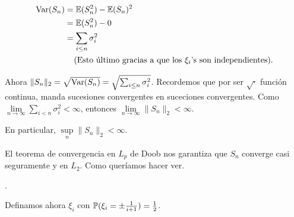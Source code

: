 \begin{align}
        \text{Var}\! \left( S_n \right)       &=  \mathbb{E}(S_n^2) - \mathbb{E}(S_n)^2                                               \\
                        &=  \mathbb{E}(S_n^2) - 0                                                       \\
                        &=  \sum_{i \leq n} \sigma_i^2                                          \\
                        &\;\;\;\;\mbox{(Esto último gracias a que los $\xi_i$'s son independientes)}.
\end{align}

Ahora $\| S_n \|_2 = \sqrt{\text{Var}\! \left( S_n \right)} = \sqrt{\sum_{i \leq n} \sigma_i^2}$. Recordemos que por ser  $\sqrt{\cdot}$
función continua, manda sucesiones convergentes en suceciones convergentes. Como 
$\lim\limits_{n \rightarrow \infty} \sum\limits_{i < n} \sigma_i^2 < \infty$, 
entonces $\lim\limits_{n \rightarrow \infty}\| S_n \|_2 < \infty$.\par\null

En particular, $\sup\limits_n \| S_n \|_2 < \infty$.\par\null

El teorema de convergencia en $L_p$ de Doob nos garantiza que $S_n$ converge casi seguramente y en $L_2$. Como queríamos
hacer ver.\par\null.

Definamos ahora $\xi_i$ con $\mathbb{P}(\xi_i = \pm \frac{1}{i+1}) = \frac{1}{2}$.
